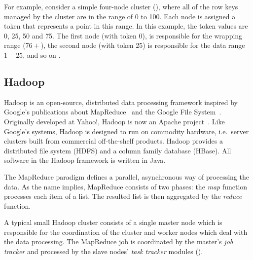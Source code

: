 For example, consider a simple four-node cluster (), where all of the row keys managed by the cluster are in the range of 0 to 100. Each node is assigned a token that represents a point in this range. In this example, the token values are 0, 25, 50 and 75. The first node (with token 0), is responsible for the wrapping range ($76+$), the second node (with token 25) is responsible for the data range $1-25$, and so on %
\cite{CassandraPartitioning}.


 
\subsection{Hadoop}

Hadoop is an open-source, distributed data processing framework inspired by Google's publications about MapReduce~\cite{Dean:2008:MSD:1327452.1327492} and the Google File System~\cite{Ghemawat:2003:GFS:945445.945450}. Originally developed at Yahoo!, Hadoop is now an Apache project~\cite{Hadoop}. Like Google's systems, Hadoop is designed to run on commodity hardware, i.e.\ server clusters built from commercial off-the-shelf products. Hadoop provides a distributed file system (HDFS) and a column family database (HBase). All software in the Hadoop framework is written in Java.

The MapReduce paradigm defines a parallel, asynchronous way of processing the data. As the name implies, MapReduce consists of two phases: the \emph{map} function processes each item of a list. The resulted list is then aggregated by the \emph{reduce} function.

A typical small Hadoop cluster consists of a single master node which is responsible for the coordination of the cluster and worker nodes which deal with the data processing. The MapReduce job is coordinated by the master's \emph{job tracker} and processed by the slave nodes' \emph{task tracker} modules ().


